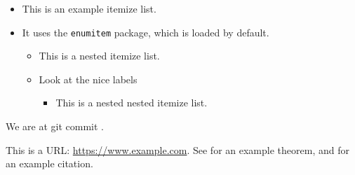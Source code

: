 \documentclass[b5paper, parskip=half-]{scrartcl} %
\begin{document}
    \begin{itemize}[itemsep=0pt]
        \item This is an example itemize list.
        \item It uses the \texttt{enumitem} package, which is loaded by default.
        \begin{itemize}[itemsep=0pt]
            \item This is a nested itemize list.
            \item Look at the nice labels
            \begin{itemize}[itemsep=0pt]
                \item This is a nested nested itemize list.
            \end{itemize}
        \end{itemize}
    \end{itemize}

    We are at git commit \texttt{\githash\dirtyplus}.


    This is a URL: \href{https://www.example.com}{https://www.example.com}.
    See  for an example theorem, and \cite{graedel1992capturing} for an example citation.
    \printbibliography
\end{document}
